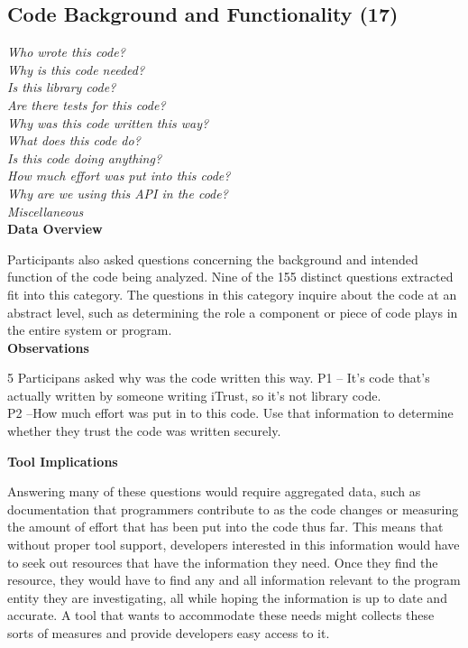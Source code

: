 \documentclass[conference]{IEEEtran}
\begin{document}

\noindent\subsection{\textbf{Code Background and Functionality (17)}}
\label{cbf}

\noindent\emph{Who wrote this code?} \\
\emph{Why is this code needed?} \\
\emph{Is this library code?} \\
\emph{Are there tests for this code?} \\
\emph{Why was this code written this way?} \\
\emph{What does this code do?} \\
\emph{Is this code doing anything?} \\
\emph{How much effort was put into this code?} \\
\emph{Why are we using this API in the code?} \\
\emph{Miscellaneous} \\

\noindent\textbf{Data Overview}

Participants also asked questions concerning the background and intended function of the code being analyzed. 
Nine of the 155 distinct questions extracted fit into this category. 
The questions in this category inquire about the code at an abstract level, such as determining the role a component or piece of code plays in the entire system or program.
\\

\noindent\textbf{Observations}

5 Participans asked why was the code written this way.
P1 -- It's code that's actually written by someone writing iTrust, so it's not library code.
\\
P2 --How much effort was put in to this code. Use that information to determine whether they trust the code was written securely.

\noindent\textbf{Tool Implications}

Answering many of these questions would require aggregated data, such as documentation that programmers contribute to as the code changes or measuring the amount of effort that has been put into the code thus far.
This means that without proper tool support, developers interested in this information would have to seek out resources that have the information they need.
Once they find the resource, they would have to find any and all information relevant to the program entity they are investigating, all while hoping the information is up to date and accurate. 
A tool that wants to accommodate these needs might collects these sorts of measures and provide developers easy access to it.
\end{document}
